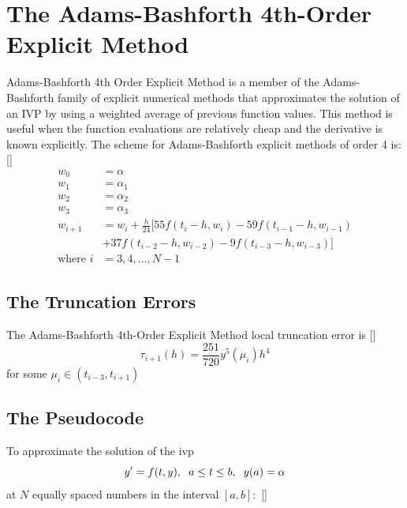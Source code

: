 \documentclass[12pt,oneside]{book}
\begin{document}
	\section{The Adams-Bashforth 4th-Order Explicit Method} \label{m:ab4e}
		\begin{spacing}{1.2}
			
			Adams-Bashforth 4th Order Explicit Method is a member of the Adams-Bashforth family of explicit numerical methods that approximates the solution of an IVP by using a weighted average of previous function values. This method is useful when the function evaluations are relatively cheap and the derivative is known explicitly.  The scheme for Adams-Bashforth explicit methods of order 4 is:[]			
			\begin{equation}
				\begin{split}
					w_0 & = \alpha \\
					w_1 & = \alpha_1 \\
					w_2 & = \alpha_2 \\
					w_3 & = \alpha_3 \\
					w_{i+1} & = w_{i} + \frac{h}{24}[ 55f(t_{i} - h, w_{i}) - 59f(t_{i-1} - h, w_{i-1}) \\
					& + 37f(t_{i-2} - h, w_{i-2}) - 9f(t_{i-3} - h, w_{i-3}) ] \\
					\text{where } i & = 3, 4, ..., N-1
				\end{split}
			\end{equation}
			
			\subsection*{The Truncation Errors}
				The Adams-Bashforth 4th-Order Explicit Method local truncation error is [] \[ \tau_{i+1}(h) = \frac{251}{720} y^{5}(\mu_{i}) h^{4} \]
				for some $ \mu_{i} \in (t_{i-3}, t_{i+1}) $
			
			\clearpage
			\subsection*{The Pseudocode}
				To approximate the solution of the \ac{ivp} 
				\[ y' = f(t,y), \hspace*{0.2cm} a \leq t \leq b, \hspace*{0.2cm} y(a) = \alpha \]
				at $ N $ equally spaced numbers in the interval $ [a, b]: $ []
				

\end{spacing}
\end{document}
